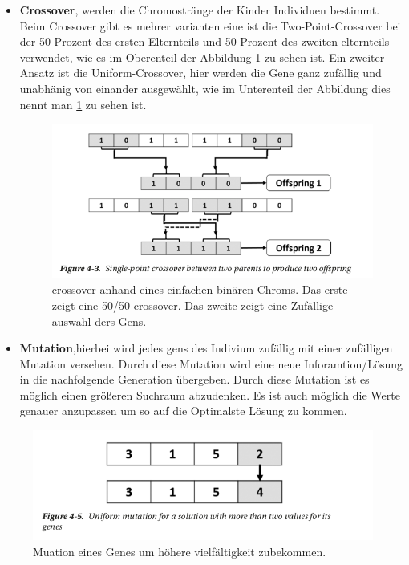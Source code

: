\begin{itemize}
\item \textbf{Crossover}, werden die Chromostränge der Kinder Individuen bestimmt. Beim Crossover gibt es mehrer varianten eine ist die Two-Point-Crossover bei der 50 Prozent des ersten Elternteils und 50 Prozent des zweiten elternteils verwendet, wie es im Oberenteil der Abbildung \ref{fig:chromoson_crossover} zu sehen ist. Ein zweiter Ansatz ist die Uniform-Crossover, hier werden die Gene ganz zufällig und unabhänig von einander ausgewählt, wie im Unterenteil der Abbildung dies nennt man  \ref{fig:chromoson_crossover} zu sehen ist. 

\begin{figure}[H]
  \centering  
  \includegraphics[scale=0.5]{img/crossover.png}
  \caption{crossover anhand eines einfachen binären Chroms. Das erste zeigt eine 50/50 crossover. Das zweite zeigt eine Zufällige auswahl ders Gens.\cite{Rashid2017} }
  \label{fig:chromoson_crossover}
\end{figure}

\item \textbf{Mutation},hierbei wird jedes gens des Indivium zufällig mit einer zufälligen Mutation versehen. Durch diese Mutation wird eine neue Inforamtion/Lösung in die nachfolgende Generation übergeben. Durch diese Mutation ist es möglich einen größeren Suchraum abzudenken. Es ist auch möglich die Werte genauer anzupassen um so auf die Optimalste Lösung zu kommen. 

\end{itemize}

\begin{figure}[H]
  \centering  
  \includegraphics[scale=0.5]{img/mutation.png}
  \caption{Muation eines Genes um höhere vielfältigkeit zubekommen.\cite{Rashid2017} }
  \label{fig:chromoson_mutation}
\end{figure}


